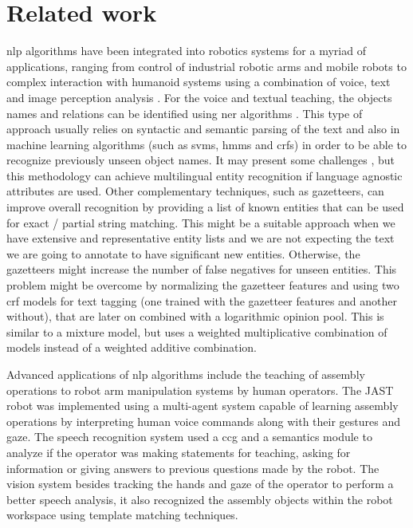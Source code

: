 \section{Related work}\label{sec:related-work}

\gls{nlp} algorithms have been integrated into robotics systems for a myriad of applications, ranging from control of industrial robotic arms \cite{Akan2011,Watanabe2006} and mobile robots \cite{Matuszek2013} to complex interaction with humanoid systems using a combination of voice, text and image perception analysis \cite{Neo2008,Barabas2012,Antunes2016}. For the voice and textual teaching, the objects names and relations can be identified using \gls{ner} algorithms \cite{Leon2014,Dlugolinsky2013}. This type of approach usually relies on syntactic and semantic parsing of the text and also in machine learning algorithms \cite{Ekbal2012} (such as \glspl{svm}, \glspl{hmm} and \glspl{crf}) in order to be able to recognize previously unseen object names. It may present some challenges \cite{Ratinov2009}, but this methodology can achieve multilingual entity recognition \cite{Rami2014} if language agnostic attributes are used. Other complementary techniques, such as gazetteers, can improve overall recognition by providing a list of known entities that can be used for exact / partial string matching. This might be a suitable approach when we have extensive and representative entity lists and we are not expecting the text we are going to annotate to have significant new entities. Otherwise, the gazetteers might increase the number of false negatives for unseen entities. This problem might be overcome \cite{Smith2006} by normalizing the gazetteer features and using two \gls{crf} models for text tagging (one trained with the gazetteer features and another without), that are later on combined with a logarithmic opinion pool. This is similar to a mixture model, but uses a weighted multiplicative combination of models instead of a weighted additive combination.

Advanced applications of \gls{nlp} algorithms include the teaching of assembly operations to robot arm manipulation systems by human operators. The JAST robot \cite{Rickert2007} was implemented using a multi-agent system capable of learning assembly operations by interpreting human voice commands along with their gestures and gaze. The speech recognition system used a \gls{ccg} and a semantics module to analyze if the operator was making statements for teaching, asking for information or giving answers to previous questions made by the robot. The vision system besides tracking the hands and gaze of the operator to perform a better speech analysis, it also recognized the assembly objects within the robot workspace using template matching techniques.

